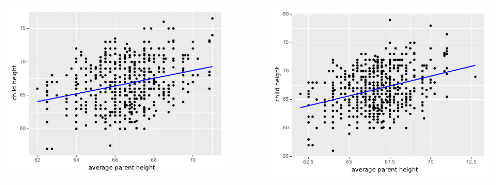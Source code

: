\documentclass[handout]{beamer}
\begin{document}
\begin{frame}
	\begin{columns}
		\begin{column}{0.48\textwidth}
			\includegraphics[width=0.9\textwidth]{../figures/galton_2.pdf}
		\end{column}
		\begin{column}{0.48\textwidth}
			\includegraphics[width=0.9\textwidth]{../figures/galton_3.pdf}
		\end{column}
	\end{columns}
	
\end{frame}
\end{document}
